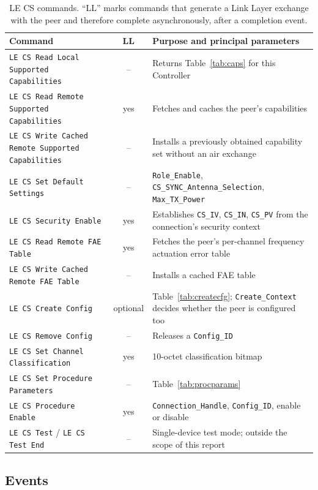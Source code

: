 \documentclass[11pt,a4paper]{article}
\newcommand{\code}[1]{\texttt{\small #1}}
\begin{document}
\begin{table}[h]
\caption{LE CS commands. ``LL'' marks commands that generate a Link Layer exchange with the peer and
therefore complete asynchronously, after a completion event.}
\label{tab:hcicmds}
\centering\small
\begin{tabular}{@{}L{50mm}cL{72mm}@{}}
\toprule
Command & LL & Purpose and principal parameters \\
\midrule
\code{LE CS Read Local Supported Capabilities} & --
  & Returns Table~\ref{tab:caps} for this Controller \\
\code{LE CS Read Remote Supported Capabilities} & yes
  & Fetches and caches the peer's capabilities \\
\code{LE CS Write Cached Remote Supported Capabilities} & --
  & Installs a previously obtained capability set without an air exchange \\
\code{LE CS Set Default Settings} & --
  & \code{Role\_Enable}, \code{CS\_SYNC\_Antenna\_Selection}, \code{Max\_TX\_Power} \\
\code{LE CS Security Enable} & yes
  & Establishes \code{CS\_IV}, \code{CS\_IN}, \code{CS\_PV} from the connection's security context \\
\code{LE CS Read Remote FAE Table} & yes
  & Fetches the peer's per-channel frequency actuation error table \\
\code{LE CS Write Cached Remote FAE Table} & --
  & Installs a cached FAE table \\
\code{LE CS Create Config} & optional
  & Table~\ref{tab:createcfg}; \code{Create\_Context} decides whether the peer is configured too \\
\code{LE CS Remove Config} & --
  & Releases a \code{Config\_ID} \\
\code{LE CS Set Channel Classification} & yes
  & 10-octet classification bitmap \\
\code{LE CS Set Procedure Parameters} & --
  & Table~\ref{tab:procparams} \\
\code{LE CS Procedure Enable} & yes
  & \code{Connection\_Handle}, \code{Config\_ID}, enable or disable \\
\code{LE CS Test} / \code{LE CS Test End} & --
  & Single-device test mode; outside the scope of this report \\
\bottomrule
\end{tabular}
\end{table}

\subsection{Events}
\end{document}
